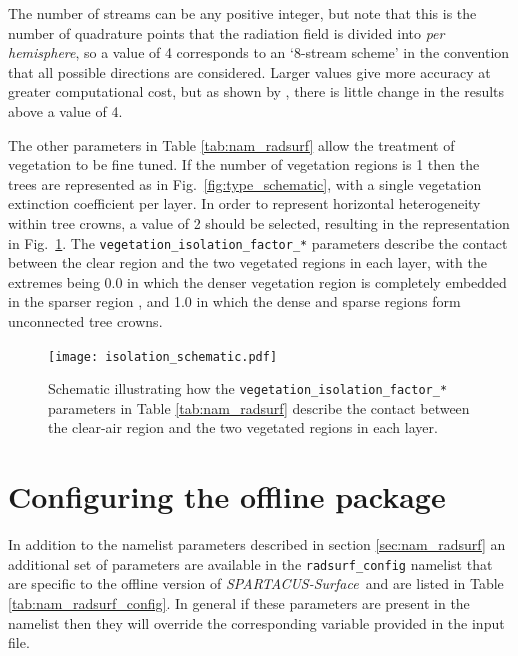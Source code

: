 \documentclass[a4,oneside]{article}
\def\codesize{\small}
\def\spsurf{\emph{SPARTACUS-Surface}}
\def\code#1{{\codesize\texttt{#1}}}
\begin{document}
The number of streams can be any positive integer, but note that this
is the number of quadrature points that the radiation field is divided
into \emph{per hemisphere}, so a value of 4 corresponds to an
`8-stream scheme' in the convention that all possible directions are
considered.  Larger values give more accuracy at greater computational
cost, but as shown by \cite{Hogan2019b}, there is little change in the
results above a value of 4.

The other parameters in Table \ref{tab:nam_radsurf} allow the
treatment of vegetation to be fine tuned. If the number of vegetation
regions is 1 then the trees are represented as in
Fig.\ \ref{fig:type_schematic}, with a single vegetation extinction
coefficient per layer.  In order to represent horizontal heterogeneity
within tree crowns, a value of 2 should be selected, resulting in the
representation in Fig.\ \ref{fig:isolation_schematic}. The
\code{vegetation\_isolation\_factor\_*} parameters describe the
contact between the clear region and the two vegetated regions in each
layer, with the extremes being 0.0 in which the denser vegetation
region is completely embedded in the sparser region \cite[the
  assumption used by][]{Hogan+2018}, and 1.0 in which the dense and
sparse regions form unconnected tree crowns.

\begin{figure}[tb!]
  \centerline{\texttt{[image: isolation\_schematic.pdf]}}
  \caption{\label{fig:isolation_schematic}Schematic illustrating how
    the \code{vegetation\_isolation\_factor\_*} parameters in Table
    \ref{tab:nam_radsurf} describe the contact between the clear-air
    region and the two vegetated regions in each layer.}
\end{figure}

\section{Configuring the offline package}
\label{sec:nam_radsurf_config}
In addition to the namelist parameters described in section
\ref{sec:nam_radsurf} an additional set of parameters are available in
the \code{radsurf\_config} namelist that are specific to the offline
version of \spsurf\ and are listed in Table
\ref{tab:nam_radsurf_config}. In general if these parameters are
present in the namelist then they will override the corresponding
variable provided in the input file.
\end{document}
